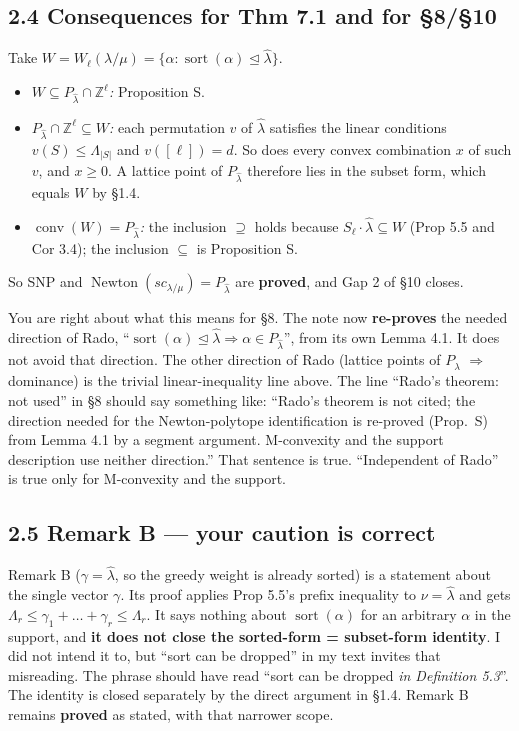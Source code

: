 \documentclass[11pt]{amsart}
\newcommand{\lh}{\hat\lambda}
\newcommand{\Z}{\mathbb{Z}}
\newcommand{\sort}{\operatorname{sort}}
\newcommand{\dom}{\trianglelefteq}
\begin{document}
\subsection*{2.4 Consequences for Thm 7.1 and for \S8/\S10}
Take $W=W_\ell(\lambda/\mu)=\{\alpha:\sort(\alpha)\dom\lh\}$.
\begin{itemize}[leftmargin=2em]
\item \emph{$W\subseteq P_{\lh}\cap\Z^\ell$:} Proposition S.
\item \emph{$P_{\lh}\cap\Z^\ell\subseteq W$:} each permutation $v$ of $\lh$ satisfies the linear conditions $v(S)\le\Lambda_{|S|}$ and $v([\ell])=d$. So does every convex combination $x$ of such $v$, and $x\ge0$. A lattice point of $P_{\lh}$ therefore lies in the subset form, which equals $W$ by \S1.4.
\item \emph{$\operatorname{conv}(W)=P_{\lh}$:} the inclusion $\supseteq$ holds because $S_\ell\cdot\lh\subseteq W$ (Prop 5.5 and Cor 3.4); the inclusion $\subseteq$ is Proposition S.
\end{itemize}
So SNP and $\operatorname{Newton}(sc_{\lambda/\mu})=P_{\lh}$ are \textbf{proved}, and Gap 2 of \S10 closes.

You are right about what this means for \S8. The note now \textbf{re-proves} the needed direction of Rado, ``$\sort(\alpha)\dom\lh\Rightarrow\alpha\in P_{\lh}$'', from its own Lemma 4.1. It does not avoid that direction. The other direction of Rado (lattice points of $P_{\lh}$ $\Rightarrow$ dominance) is the trivial linear-inequality line above. The line ``Rado's theorem: not used'' in \S8 should say something like: ``Rado's theorem is not cited; the direction needed for the Newton-polytope identification is re-proved (Prop.~S) from Lemma 4.1 by a segment argument. M-convexity and the support description use neither direction.'' That sentence is true. ``Independent of Rado'' is true only for M-convexity and the support.

\subsection*{2.5 Remark B --- your caution is correct}
Remark B ($\gamma=\lh$, so the greedy weight is already sorted) is a statement about the single vector $\gamma$. Its proof applies Prop 5.5's prefix inequality to $\nu=\lh$ and gets $\Lambda_r\le\gamma_1+\dots+\gamma_r\le\Lambda_r$. It says nothing about $\sort(\alpha)$ for an arbitrary $\alpha$ in the support, and \textbf{it does not close the sorted-form = subset-form identity}. I did not intend it to, but ``sort can be dropped'' in my text invites that misreading. The phrase should have read ``sort can be dropped \emph{in Definition 5.3}''. The identity is closed separately by the direct argument in \S1.4. Remark B remains \textbf{proved} as stated, with that narrower scope.
\end{document}
